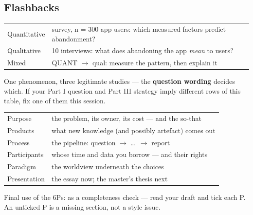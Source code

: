 \documentclass[11pt,a4paper,british,twoside=false,headings=small,chapterprefix=false,numbers=noenddot]{scrbook}
\begin{document}
\subsection{Flashbacks}
\begin{center}\small
\footnotesize
  \renewcommand{\arraystretch}{1.35}
  \begin{tabular}{@{}p{3.1cm}p{9.9cm}@{}}
    \toprule
    Quantitative & survey, n = 300 app users: which measured factors predict abandonment?\\
    Qualitative & 10 interviews: what does abandoning the app \emph{mean} to users?\\
    Mixed & QUANT $\rightarrow$ qual: measure the pattern, then explain it\\
    \bottomrule
  \end{tabular}
  

  One phenomenon, three legitimate studies --- the \textbf{question wording}
  decides which. If your Part I question and Part III strategy imply
  different rows of this table, fix one of them this session.
\end{center}

\begin{center}\small
\small
  \renewcommand{\arraystretch}{1.35}
  \begin{tabular}{@{}p{3.0cm}p{10.0cm}@{}}
    \toprule
    Purpose & the problem, its owner, its cost --- and the so-that\\
    Products & what new knowledge (and possibly artefact) comes out\\
    Process & the pipeline: question $\rightarrow$ \dots\ $\rightarrow$ report\\
    Participants & whose time and data you borrow --- and their rights\\
    Paradigm & the worldview underneath the choices\\
    Presentation & the essay now; the master's thesis next\\
    \bottomrule
  \end{tabular}
  

  Final use of the 6Ps: as a completeness check --- read your draft and tick
  each P. An unticked P is a missing section, not a style issue.
\end{center}
\end{document}
